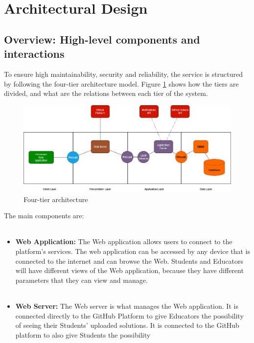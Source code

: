 \documentclass{article}
\begin{document}
{\newpage
\pagestyle{ArchitecturalDesignStyle}

\section{Architectural Design}
    \subsection{Overview: High-level components and interactions}
    To ensure high maintainability, security and reliability, the service is structured by following 
    the four-tier architecture model.
    Figure \ref{fig:Figure 1} shows how the tiers are divided, and what are the relations between 
    each tier of the system.
    \begin{figure}[H]
        \centering
        \includegraphics[scale=0.35]{images/FourTierApplication.png}
        \caption{Four-tier architecture}
        \label{fig:Figure 1}
    \end{figure}
    \noindent
    The main components are: \\ \\
    \begin{itemize}
        \item \textbf{Web Application:} The Web application allows users to connect to the platform's 
        services. The web application can be accessed by any device that is connected to the internet 
        and can browse the Web. Students and Educators will have different views of the Web application, 
        because they have different parameters that they can view and manage. \\ \\
        \item \textbf{Web Server:} The Web server is what manages the Web application. It is connected 
        directly to the GitHub Platform to give Educators the possibility of seeing their Students' 
        uploaded solutions. It is connected to the GitHub platform to also give Students the possibility 

\end{itemize}}
\end{document}
